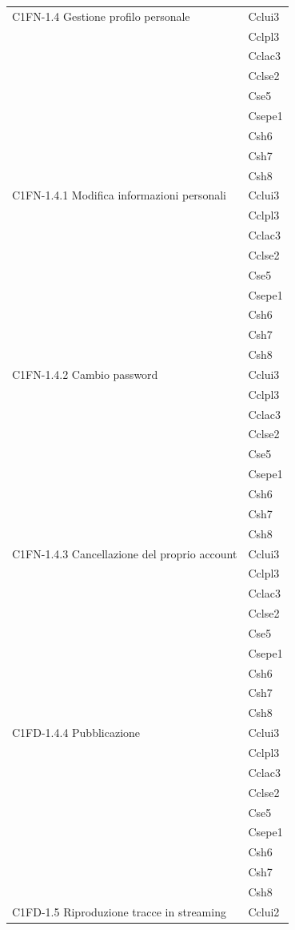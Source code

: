 \begin{footnotesize}
\begin{longtable}[!h]{|l|l|}
C1FN-1.4 Gestione profilo personale & Cclui3\\
 & Cclpl3\\
 & Cclac3\\
 & Cclse2\\
 & Cse5\\ 
 & Csepe1\\ 
 & Csh6\\  
 & Csh7\\
 & Csh8\\ \hline  
C1FN-1.4.1 Modifica informazioni personali & Cclui3\\
 & Cclpl3\\
 & Cclac3\\
 & Cclse2\\
 & Cse5\\ 
 & Csepe1\\ 
 & Csh6\\  
 & Csh7\\
 & Csh8\\ \hline
C1FN-1.4.2 Cambio password & Cclui3\\
 & Cclpl3\\
 & Cclac3\\
 & Cclse2\\
 & Cse5\\ 
 & Csepe1\\ 
 & Csh6\\  
 & Csh7\\
 & Csh8\\ \hline  
C1FN-1.4.3 Cancellazione del proprio account & Cclui3\\
 & Cclpl3\\
 & Cclac3\\
 & Cclse2\\
 & Cse5\\ 
 & Csepe1\\ 
 & Csh6\\  
 & Csh7\\
 & Csh8\\ \hline  
C1FD-1.4.4 Pubblicazione & Cclui3\\
 & Cclpl3\\
 & Cclac3\\
 & Cclse2\\
 & Cse5\\ 
 & Csepe1\\ 
 & Csh6\\  
 & Csh7\\
 & Csh8\\ \hline  
C1FD-1.5 Riproduzione tracce in streaming & Cclui2\\

\end{longtable}
\end{footnotesize}
